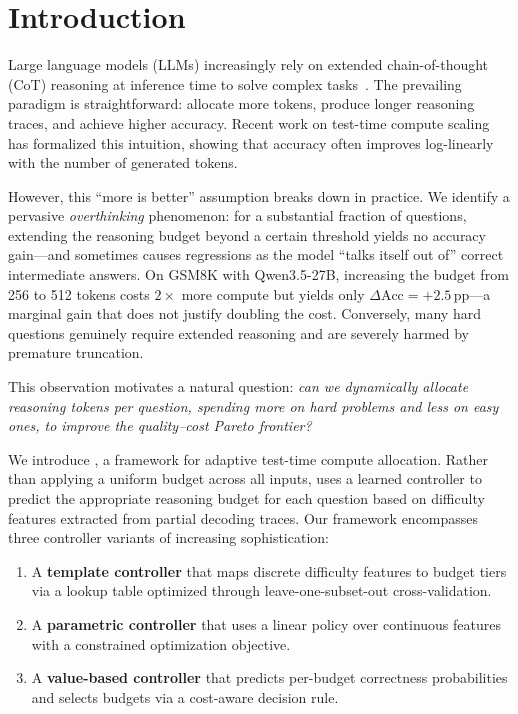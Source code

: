 \section{Introduction}
\label{sec:intro}

Large language models (LLMs) increasingly rely on extended chain-of-thought (CoT) reasoning at inference time to solve complex tasks~\citep{wei2022chain,openai2024o1}.
The prevailing paradigm is straightforward: allocate more tokens, produce longer reasoning traces, and achieve higher accuracy.
Recent work on test-time compute scaling~\citep{snell2024scaling} has formalized this intuition, showing that accuracy often improves log-linearly with the number of generated tokens.

However, this ``more is better'' assumption breaks down in practice.
We identify a pervasive \emph{overthinking} phenomenon: for a substantial fraction of questions, extending the reasoning budget beyond a certain threshold yields no accuracy gain---and sometimes causes regressions as the model ``talks itself out of'' correct intermediate answers.
On GSM8K with Qwen3.5-27B, increasing the budget from 256 to 512 tokens costs $2\times$ more compute but yields only $\Delta\text{Acc} = +2.5$\,pp---a marginal gain that does not justify doubling the cost.
Conversely, many hard questions genuinely require extended reasoning and are severely harmed by premature truncation.

This observation motivates a natural question: \emph{can we dynamically allocate reasoning tokens per question, spending more on hard problems and less on easy ones, to improve the quality--cost Pareto frontier?}

We introduce \adathink{}, a framework for adaptive test-time compute allocation.
Rather than applying a uniform budget across all inputs, \adathink{} uses a learned controller to predict the appropriate reasoning budget for each question based on difficulty features extracted from partial decoding traces.
Our framework encompasses three controller variants of increasing sophistication:
\begin{enumerate}[nosep,leftmargin=*]
    \item A \textbf{template controller} that maps discrete difficulty features to budget tiers via a lookup table optimized through leave-one-subset-out cross-validation.
    \item A \textbf{parametric controller} that uses a linear policy over continuous features with a constrained optimization objective.
    \item A \textbf{value-based controller} that predicts per-budget correctness probabilities and selects budgets via a cost-aware decision rule.
\end{enumerate}

